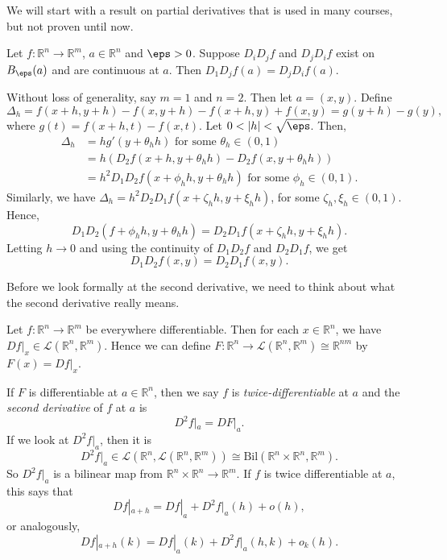 \documentclass[12pt]{article}
\begin{document}
We will start with a result on partial derivatives that is used in many courses, but not proven until now.

\begin{theorem}
	Let $f : \mathbb{R}^{n} \to \mathbb{R}^{m}$, $a \in \mathbb{R}^{n}$ and $\eps > 0$. Suppose $D_iD_jf$ and $D_jD_if$ exist on $B_{\eps}(a)$ and are continuous at $a$. Then $D_1D_jf(a) = D_jD_if(a)$.
\end{theorem}

\begin{proofbox}
	Without loss of generality, say $m = 1$ and $n = 2$. Then let $a = (x, y)$. Define
	\[
	\Delta_h = f(x+h, y+h) - f(x, y+h) - f(x+h, y) + f(x, y) = g(y + h) - g(y)
	,\]
	where $g(t) = f(x+h, t) - f(x, t)$. Let $0 < |h| < \sqrt \eps$. Then,
	\begin{align*}
		\Delta_h &= h g'(y+\theta_h h) \text{ for some } \theta_h \in (0, 1) \\
			 &= h(D_2 f(x+h, y+\theta_h h) - D_2f(x, y + \theta_h h)) \\
			 &= h^2D_1D_2f(x+\phi_h h, y + \theta_h h) \text{ for some } \phi_h \in (0, 1).
	\end{align*}
	Similarly, we have $\Delta_h = h^2D_2D_1f(x+\zeta_h h, y+\xi_h h)$, for some $\zeta_h, \xi_h \in (0, 1)$. Hence,
	\[
	D_1 D_2(f + \phi_h h, y + \theta_h h) = D_2 D_1f(x + \zeta_h h, y + \xi_h h)
	.\]
	Letting $h \to 0$ and using the continuity of $D_1D_2f$ and $D_2D_1f$, we get
	\[
	D_1D_2f(x, y) = D_2D_1f(x, y)
	.\]
\end{proofbox}

Before we look formally at the second derivative, we need to think about what the second derivative really means.

Let $f : \mathbb{R}^{n} \to \mathbb{R}^{m}$ be everywhere differentiable. Then for each $x \in \mathbb{R}^{n}$, we have $Df|_x \in \mathcal{L}(\mathbb{R}^{n}, \mathbb{R}^{m})$. Hence we can define $F : \mathbb{R}^{n} \to \mathcal{L} (\mathbb{R}^{n}, \mathbb{R}^{m}) \cong \mathbb{R}^{nm}$ by $F(x) = Df|_x$.

If $F$ is differentiable at $a \in \mathbb{R}^{n}$, then we say $f$ is \textit{twice-differentiable} at $a$ and the \textit{second derivative} of $f$ at $a$ is
\[
D^2f|_a = DF|_a
.\]
If we look at $D^2f|_a$, then it is
\[
	D^2f|_a \in \mathcal{L}(\mathbb{R}^{n}, \mathcal{L}(\mathbb{R}^{n}, \mathbb{R}^{m})) \cong \mathrm{Bil}(\mathbb{R}^{n} \times \mathbb{R}^{n} , \mathbb{R}^{m})
.\]
So $D^2f|_a$ is a bilinear map from $\mathbb{R}^{n} \times \mathbb{R}^{n} \to \mathbb{R}^{m}$. If $f$ is twice differentiable at $a$, this says that
\[
Df|_{a+h} = Df|_a + D^2f|_a(h) + o(h)
,\]
or analogously,
\[
Df|_{a+h}(k) = Df|_a(k) + D^2f|_a(h,k) + o_k(h)
.\]
\end{document}
